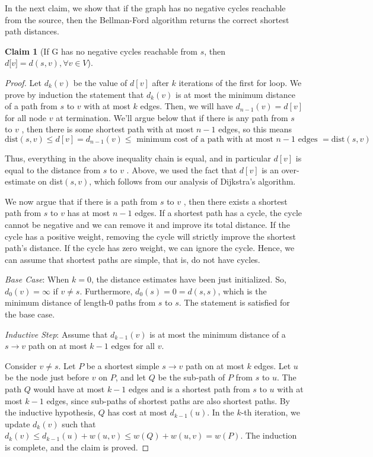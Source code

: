 \documentclass [12pt]{article}
\theoremstyle{definition}
\newtheorem{claim}{Claim}
\begin{document}
In the next claim, we show that if the graph has no negative cycles reachable from the source, then the Bellman-Ford algorithm returns the correct shortest path distances. 

\begin{claim}[If G has no negative cycles reachable from $s$, then $d[v\text{]} = d(s, v ), \forall v \in V$]

\begin{proof} 

Let $d_k (v )$ be the value of $d[v ]$ after $k$ iterations of the first for loop. We prove by induction the statement that $d_k (v )$ is at most the minimum distance of a path from $s$ to $v$ with at most $k$ edges. Then, we will have $d_{n-1}(v ) = d[v ]$ for all node $v$ at termination. We'll argue below that if there is any path from $s$ to $v$ , then there is some shortest path with at most $n - 1$ edges, so this means 
$$
\text{dist}(s, v ) \leq d[v ] = d_{n-1}(v ) \leq \text{ minimum cost of a path with at most } n - 1 \text{ edges } = \text{dist}(s, v )
$$

Thus, everything in the above inequality chain is equal, and in particular $d[v ]$ is equal to the distance from $s$ to $v$ . Above, we used the fact that $d[v ]$ is an over-estimate on dist$(s, v )$, which follows from our analysis of Dijkstra's algorithm. 

We now argue that if there is a path from $s$ to $v$ , then there exists a shortest path from $s$ to $v$ has at most $n - 1$ edges. If a shortest path has a cycle, the cycle cannot be negative and we can remove it and improve its total distance. If the cycle has a positive weight, removing the cycle will strictly improve the shortest path's distance. If the cycle has zero weight, we can ignore the cycle. Hence, we can assume that shortest paths are simple, that is, do not have cycles. 

\textit{Base Case}: When $k = 0$, the distance estimates have been just initialized. So, $d_0(v ) = \infty$ if $v \neq s$. Furthermore, $d_0(s) = 0 = d(s, s)$, which is the minimum distance of length-$0$ paths from $s$ to $s$. The statement is satisfied for the base case. 

\textit{Inductive Step}: Assume that $d_{k-1}(v )$ is at most the minimum distance of a $s \to v$ path on at most $k - 1$ edges for all $v$. 

Consider $v \neq s$. Let $P$ be a shortest simple $s \to v$ path on at most $k$ edges. Let $u$ be the node just before $v$ on $P$, and let $Q$ be the sub-path of $P$ from $s$ to $u$. The path $Q$ would have at most $ k - 1 $ edges and is a shortest path from $s$ to $u$ with at most $k - 1$ edges, since sub-paths of shortest paths are also shortest paths. By the inductive hypothesis, $Q$ has cost at most $d_{k-1}(u)$. In the $k$-th iteration, we update $d_k (v )$ such that $d_k (v ) \leq d_{k-1}(u) + w(u, v ) \leq w(Q) + w(u, v ) = w(P)$. The induction is complete, and the claim is proved.

\end{proof}
\end{claim}
\end{document}
